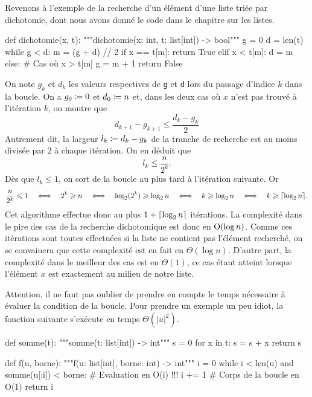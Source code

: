 \documentclass{magnolia}
\begin{document}
Revenons à l'exemple de la recherche d'un élément d'une liste triée par dichotomie, dont
nous avons donné le code dans le chapitre sur les listes.
\begin{pythoncodeline}
def dichotomie(x, t):
    """dichotomie(x: int, t: list[int]) -> bool"""
    g = 0
    d = len(t)
    while g < d:
        m = (g + d) // 2
        if x == t[m]:
            return True
        elif x < t[m]:
            d = m
        else:              # Cas où x > t[m]
            g = m + 1
    return False
\end{pythoncodeline}
On note $g_k$ et $d_k$ les valeurs respectives de \verb!g! et \verb!d! lors du passage
d'indice $k$ dans la boucle. On a $g_0\coloneqq 0$ et $d_0\coloneqq n$ et, dans les
deux cas où $x$ n'est pas trouvé à l'itération $k$, on montre que
\[d_{k+1}-g_{k+1}\leq \frac{d_k-g_k}{2}\]
Autrement dit, la largeur $l_k\coloneqq d_k-g_k$ de la tranche de recherche est
au moins divisée par
2 à chaque itération. On en déduit que
\[l_k \leq \frac{n}{2^k}.\]
Dès que $l_k\leq 1$, on sort de la boucle au plus tard à l'itération suivante. Or
\[\frac{n}{2^k} \leq 1 \quad\ssi\quad 2^k\geq n \quad\ssi\quad \log_2(2^k) \geq \log_2 n
  \quad\ssi\quad k \geq \log_2 n \quad\ssi\quad k\geq \ents{\log_2 n}.\]
Cet algorithme effectue donc au plus $1+\left\lceil\log_2 n\right\rceil$ itérations.
La complexité dans le pire des cas de la recherche dichotomique
est donc en ${\rm O}(\log n)$. Comme ces itérations sont toutes effectuées si la liste
ne contient pas l'élément recherché, on se convaincra que cette complexité est 
en fait en $\Theta(\log n)$. D'autre part, la complexité dans le meilleur
des cas est en $\Theta(1)$, ce cas étant atteint lorsque l'élément $x$ est exactement
au milieu de notre liste.\\

\begin{remarqueUnique}
\remarque
  Attention, il ne faut pas oublier de prendre en compte le
  temps nécessaire à évaluer la condition de la boucle. Pour prendre
  un exemple un peu idiot, la fonction suivante s'exécute
  en temps $\Theta(|u|^2)$.
\begin{pythoncodeline}
def somme(t):
    """somme(t: list[int]) -> int"""
    s = 0
    for x in t:
        s = s + x
    return s

def f(u, borne):
    """f(u: list[int], borne: int) -> int"""
    i = 0
    while i < len(u) and somme(u[:i]) < borne: # Evaluation en O(i) !!!
        i += 1                                 # Corps de la boucle en O(1)
    return i
\end{pythoncodeline}
\end{remarqueUnique}
\end{document}
